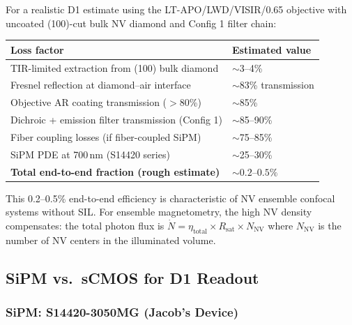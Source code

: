 For a realistic D1 estimate using the LT-APO/LWD/VISIR/0.65 objective with
uncoated (100)-cut bulk NV diamond and Config 1 filter chain:

\begin{center}
\small
\begin{tabular}{ll}
\toprule
\textbf{Loss factor} & \textbf{Estimated value} \\
\midrule
TIR-limited extraction from (100) bulk diamond\cite{Hopper2018}
  & $\sim$3--4\% \\
Fresnel reflection at diamond--air interface
  & $\sim$83\% transmission \\
Objective AR coating transmission ($> 80$\%)\cite{AttocubeLTAPOLWD_web}
  & $\sim$85\% \\
Dichroic + emission filter transmission (Config 1)\cite{ThorlabsDMLP650_web}
  & $\sim$85--90\% \\
Fiber coupling losses (if fiber-coupled SiPM)\cite{Hogele2008}
  & $\sim$75--85\% \\
SiPM PDE at 700\,nm (S14420 series)\cite{S14420datasheet}
  & $\sim$25--30\% \\
\midrule
\textbf{Total end-to-end fraction (rough estimate)}
  & $\mathbf{\sim 0.2\text{--}0.5\%}$ \\
\bottomrule
\end{tabular}
\end{center}

This 0.2--0.5\% end-to-end efficiency is characteristic of NV ensemble confocal
systems without SIL. For ensemble magnetometry, the high NV density compensates:
the total photon flux is $\dot{N} = \eta_\text{total} \times R_\text{sat} \times N_\text{NV}$
where $N_\text{NV}$ is the number of NV centers in the illuminated volume.\cite{Barry2020}

\subsection{SiPM vs.\ sCMOS for D1 Readout}
\label{sec:oq4_detector}

\subsubsection{SiPM: S14420-3050MG (Jacob's Device)}

